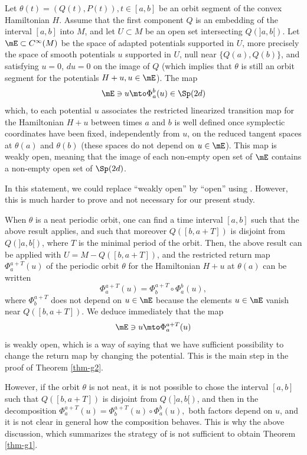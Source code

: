 \begin{prop}\label{prop-wo}
Let $\theta(t)=(Q(t),P(t)), t\in [a,b]$ be an orbit segment of the convex Hamiltonian $H$. Assume that the first component
$Q$ is an embedding of the interval $[a,b]$ into $M$, and let $U\subset M$ be an open set intersecting $Q(]a,b[)$.
Let $\mE\subset C^{\infty}(M)$ be the space of adapted potentials supported in $U$, more precisely the space of smooth potentials $u$ supported in $U$, null near $\{Q(a),Q(b)\}$, and satisfying $u=0$, $du=0$ on the image of $Q$ (which implies that $\theta$ is still an orbit segment for the potentials $H+u, u\in \mE$).
The map
\[
\mE \ni u\mto \Phi_a^{b}(u)\in \Sp(2d)
\]
which, to each potential $u$ associates the restricted linearized transition map for the Hamiltonian $H+u$ between times $a$ and $b$ is well defined once symplectic coordinates have been fixed, independently from $u$, on the reduced tangent spaces at $\theta(a)$ and $\theta(b)$ (these spaces do not depend on $u\in \mE$).
This map is weakly open, meaning that the image of each non-empty open set of $\mE$ contains a non-empty open set of $\Sp(2d)$.
\end{prop}

In this statement, we could replace ``weakly open'' by ``open'' using \cite{LRR}. However, this is much harder to prove and not necessary for our present study.

When $\theta$ is a neat periodic orbit, one can find a time interval $[a,b]$ such that the above result applies, and such that moreover $Q([b,a+T])$ is disjoint from $Q(]a,b[)$, where $T$ is the minimal period of the orbit. Then, the above result can be applied with $U=M-Q([b,a+T])$, and the restricted return map $\Phi_a^{a+T}(u)$ of the periodic orbit $\theta$ for
the Hamiltonian $H+u$ at $\theta(a)$ can be written
\[
\Phi_a^{a+T}(u)= \Phi_b^{a+T}\circ\Phi_a^{b}(u),
\]
where $\Phi_b^{a+T}$ does not depend on $u\in \mE$ because the elements $u\in \mE$ vanish near $Q([b,a+T])$. We deduce immediately that the map
\[
\mE\ni u\mto \Phi_a^{a+T}(u)\]
is weakly open, which is a way of saying that we have sufficient possibility to change the return map by changing the potential.
This is the main step in the proof of Theorem \ref{thm-g2}.

However, if the orbit $\theta$ is not neat, it is not possible to chose the interval $[a,b]$ such that
$Q([b,a+T])$ is disjoint from $Q(]a,b[)$, and then in the decomposition
$\Phi_a^{a+T}(u)= \Phi_b^{a+T}(u)\circ\Phi_a^{b}(u),
$
both factors depend on $u$, and it is not clear in general how the composition behaves.
This is why the above discussion, which summarizes the strategy of \cite{O08,RR} is not sufficient to obtain Theorem \ref{thm-g1}.

